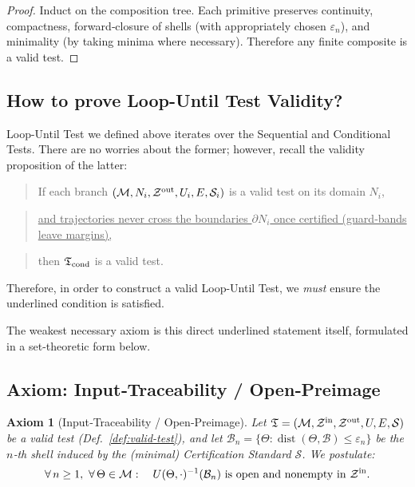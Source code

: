 \documentclass[12pt]{article}
\theoremstyle{definition}
\theoremstyle{plain}
\newtheorem{axiom}{Axiom}[section]
\begin{document}
\begin{proof}
Induct on the composition tree.  Each primitive preserves continuity, compactness, forward‑closure of shells (with appropriately chosen $\varepsilon_n$), and minimality (by taking minima where necessary).  Therefore any finite composite is a valid test.
\end{proof}

\subsection{How to prove Loop-Until Test Validity?}
Loop-Until Test we defined above iterates over the Sequential and Conditional Tests. There are no worries about the former; however, recall the validity proposition of the latter:
\begin{quote}
    If each branch $(\mathcal M,N_i,\mathcal Z^{\rm out},U_i,E,\mathcal S_i)$ is a valid test on its domain $N_i$, 
\end{quote}
\begin{quote}
\underline{and trajectories never cross the boundaries $\partial N_i$ once certified (guard‑bands leave margins),}
\end{quote}
\begin{quote}
then $\mathfrak T_{\rm cond}$ is a valid test.
\end{quote}
Therefore, in order to construct a valid Loop-Until Test, we \emph{must} ensure the underlined condition is satisfied.

The weakest necessary axiom is this direct underlined statement itself, formulated in a set-theoretic form below.


\subsection{Axiom: Input‑Traceability / Open‑Preimage}
\label{subsec:axiom-input-traceability}

\begin{axiom}[Input‑Traceability / Open‑Preimage]
\label{ax:open-preimage}
Let $\mathfrak T=(\mathcal M,\mathcal Z^{\rm in},\mathcal Z^{\rm out},U,E,\mathcal S)$ be a valid test (Def.~\ref{def:valid-test}), and let $\mathcal B_n=\{\Theta:\operatorname{dist}(\Theta,\mathcal B)\le\varepsilon_n\}$ be the $n$‑th shell induced by the (minimal) Certification Standard $\mathcal S$.  We postulate:
\[
  \forall\,n\ge1,\ \forall\,\Theta\in\mathcal M:\quad
  U(\Theta,\cdot)^{-1}(\mathcal B_n)
  \ \text{is open and nonempty in }\mathcal Z^{\rm in}.
\]
\end{axiom}
\end{document}
